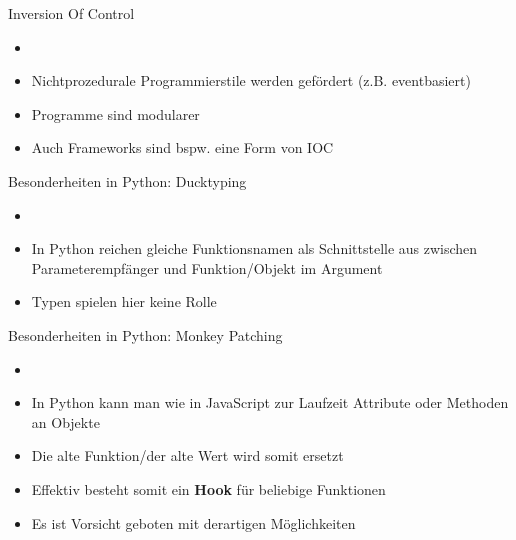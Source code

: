 \begin{frame}{Inversion Of Control}
\begin{itemize}
        \setlength{\itemindent}{1.25in}
        \item [\textbf{Inversion Of Control}]
    \end{itemize}

    \begin{itemize}
        \item Nichtprozedurale Programmierstile werden gefördert (z.B. eventbasiert)
        \item Programme sind modularer
        \item Auch Frameworks sind bspw. eine Form von IOC
   \end{itemize}

\end{frame}

 
\begin{frame}{Besonderheiten in Python: Ducktyping}
  \begin{itemize}
        \setlength{\itemindent}{1.2in}
        \item [\textbf{Recap: Ducktyping}]
    \end{itemize}

    \begin{itemize}
        \item In Python reichen gleiche Funktionsnamen als Schnittstelle aus zwischen Parameterempfänger und Funktion/Objekt im Argument
        \item Typen spielen hier keine Rolle
    \end{itemize}

  \end{frame}
  
  
\begin{frame}{Besonderheiten in Python: Monkey Patching }
  \begin{itemize}
        \setlength{\itemindent}{1.1in}
        \item [\textbf{Monkey Patching}]
    \end{itemize}

    \begin{itemize}
        \item In Python kann man wie in JavaScript zur Laufzeit Attribute oder Methoden an Objekte   
        \item Die alte Funktion/der alte Wert wird somit ersetzt
        \item Effektiv besteht somit ein \textbf{Hook} für beliebige Funktionen
        \item Es ist Vorsicht geboten mit derartigen Möglichkeiten
    \end{itemize}

  \end{frame}
  
